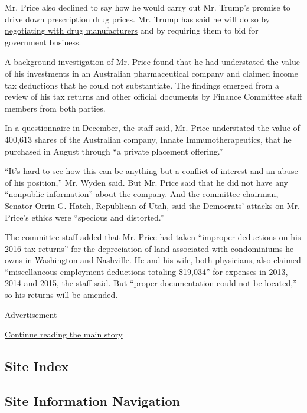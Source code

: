 Mr. Price also declined to say how he would carry out Mr. Trump's
promise to drive down prescription drug prices. Mr. Trump has said he
will do so by
\href{https://www.nytimes.com/2017/01/23/health/the-fight-trump-faces-over-drug-prices.html}{negotiating
with drug manufacturers} and by requiring them to bid for government
business.

A background investigation of Mr. Price found that he had understated
the value of his investments in an Australian pharmaceutical company and
claimed income tax deductions that he could not substantiate. The
findings emerged from a review of his tax returns and other official
documents by Finance Committee staff members from both parties.

In a questionnaire in December, the staff said, Mr. Price understated
the value of 400,613 shares of the Australian company, Innate
Immunotherapeutics, that he purchased in August through ``a private
placement offering.''

``It's hard to see how this can be anything but a conflict of interest
and an abuse of his position,'' Mr. Wyden said. But Mr. Price said that
he did not have any ``nonpublic information'' about the company. And the
committee chairman, Senator Orrin G. Hatch, Republican of Utah, said the
Democrats' attacks on Mr. Price's ethics were ``specious and
distorted.''

The committee staff added that Mr. Price had taken ``improper deductions
on his 2016 tax returns'' for the depreciation of land associated with
condominiums he owns in Washington and Nashville. He and his wife, both
physicians, also claimed ``miscellaneous employment deductions totaling
\$19,034'' for expenses in 2013, 2014 and 2015, the staff said. But
``proper documentation could not be located,'' so his returns will be
amended.

Advertisement

\protect\hyperlink{after-bottom}{Continue reading the main story}

\hypertarget{site-index}{%
\subsection{Site Index}\label{site-index}}

\hypertarget{site-information-navigation}{%
\subsection{Site Information
Navigation}\label{site-information-navigation}}

